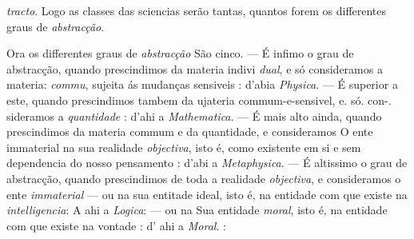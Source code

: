 \emph{tracto}. Logo as classes das sciencias serão tantas, quantos forem os differentes graus de \emph{abstracção}. \textbar{}

Ora os differentes graus de \emph{abstracção} São cinco. --- É infimo o grau de abstracção, quando prescindimos da materia indivi \emph{dual}, e só consideramos a materia: \emph{commu}, sujeita ás mudanças sensiveis : d'abia \emph{Physica}. --- É superior a este, quando prescindimos tambem da ujateria commum-e-sensivel, e. só. con-. sideramos a \emph{quantidade} : d'ahi a \emph{Mathematica}. --- É mais alto ainda, quando prescindimos da materia commum e da quantidade, e consideramos O ente immaterial na sua realidade \emph{objectiva}, isto é, como existente em si e sem dependencia do nosso pensamento : d'abi a \emph{Metaphysica}. --- É altissimo o grau de abstracção, quando prescindimos de toda a realidade \emph{objectiva}, e consideramos o ente \emph{immaterial} --- ou na sua entitade ideal, isto é, na entidade com que existe na \emph{intelligencia}: A ahi a \emph{Logica}: --- ou na Sua entidade \emph{moral}, isto é, na entidade com que existe na vontade : d' ahi a \emph{Moral}. :

